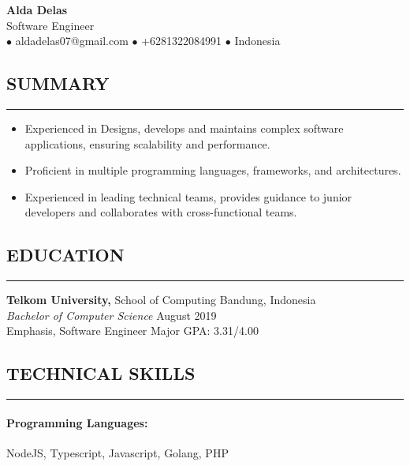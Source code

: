 \documentclass{article}
\begin{document}
{\centering
    {\LARGE \textbf{Alda Delas}} \\[0.2em]  %
    {\normalsize Software Engineer} \\[0.2em]           %
    {\normalsize $\bullet$ aldadelas07@gmail.com $\bullet$ +6281322084991 $\bullet$ Indonesia} \\[0.5em]        %
}

\subsection*{SUMMARY}
\vspace{-0.1em}
\hrule
\vspace{0.4em}

\begin{itemize}
    \setlength{\itemsep}{-0.3em}
    \item Experienced in Designs, develops and maintains complex software applications, ensuring scalability and performance.
    \item Proficient in multiple programming languages, frameworks, and architectures.
    \item Experienced in leading technical teams, provides guidance to junior developers and collaborates with cross-functional teams.
\end{itemize}

\subsection*{EDUCATION}
\vspace{-0.1em}
\hrule
\vspace{0.4em}
{\bf Telkom University, }School of Computing \hfill Bandung, Indonesia \\
{\it Bachelor of Computer Science} \hfill August 2019 \\
Emphasis, Software Engineer \hfill Major GPA: 3.31/4.00

\subsection*{TECHNICAL SKILLS}
\vspace{-0.1em}
\hrule
\vspace{0.4em}
\paragraph{Programming Languages:} NodeJS, Typescript, Javascript, Golang, PHP
\vspace{-1.4em}
\end{document}
